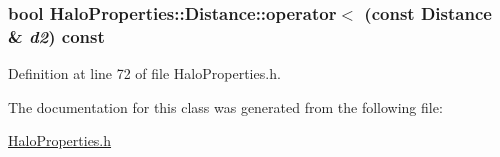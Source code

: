 \subsubsection[{operator$<$}]{\setlength{\rightskip}{0pt plus 5cm}bool HaloProperties::Distance::operator$<$ (const {\bf Distance} \& {\em d2}) const}\label{classHaloProperties_1_1Distance_aa0a4fa026c788c56c9a2fc404df9402c}


Definition at line 72 of file HaloProperties.h.



The documentation for this class was generated from the following file:\begin{DoxyCompactItemize}
\item 
\hyperlink{HaloProperties_8h}{HaloProperties.h}\end{DoxyCompactItemize}
